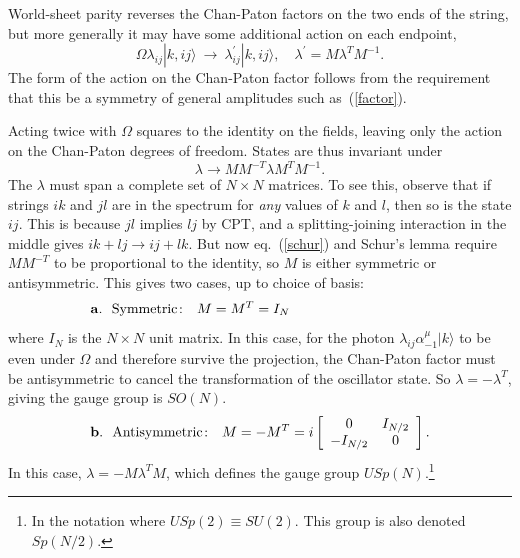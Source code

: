 \documentclass[12pt]{article}
\def\be{\begin{equation}}
\def\ee{\end{equation}}
\begin{document}
World-sheet parity reverses the Chan-Paton factors on the two ends of the
string, but more generally it may have some additional action on each
endpoint,
\be
\Omega\lambda_{ij}|{ k},ij \rangle\ \to\
\lambda^\prime_{ij} |{ k},ij \rangle, \quad
\lambda^\prime= M \lambda^{T} M^{-1}.
\ee
The form of the action on the Chan-Paton factor follows from the requirement
that this be a symmetry of general amplitudes such as~(\ref{factor}).

Acting twice with $\Omega$ squares to the identity on the fields, leaving
only the action on the Chan-Paton degrees of freedom. States are thus
invariant under 
\be
\lambda\to MM^{-T}\lambda M^TM^{-1}. \label{schur}
\ee  
The $\lambda$ must span a complete set of $N \times N$ matrices.  To see
this, observe that if strings $ik$ and $jl$ are in the spectrum for {\it any}
values of $k$ and
$l$, then so is the state $ij$.  This is because $jl$ implies $lj$ by CPT, and
a splitting-joining interaction in the middle gives $ik + lj \to ij + lk$.
But now eq.~(\ref{schur}) and Schur's lemma require $MM^{-T}$ to be
proportional to the identity,
so $M$ is either symmetric or antisymmetric.
This gives
two cases, up to choice of basis: \cite{sms}
\be
{\bf a.\ \ }{\rm Symmetric\colon}\ \ M=M^T=I_N
\qquad\qquad\qquad\qquad\qquad
\ee 
where $I_N$ is the $N\times N$ unit matrix.  In this case, for the photon
$\lambda_{ij}\alpha^\mu_{-1}|{ k}\rangle$ to be even under $\Omega$ and
therefore survive the projection, the Chan-Paton factor must be antisymmetric
to cancel the transformation of the oscillator state.  So
$\lambda=-\lambda^T$, giving the gauge group is $SO(N)$.
\be
{\bf b.\ \ }{\rm Antisymmetric\colon}
\ \ M=-M^T=i\left[ \begin{array}{cc}
0&I_{N/2}\\ -I_{N/2}&0 \end{array}\right].
\ee
In this case, $\lambda=-M\lambda^TM$, which defines the gauge
group $USp(N)$.\footnote{In the notation where $USp(2)\equiv SU(2)$.  This
group is also denoted $Sp(N/2)$.}
\end{document}
